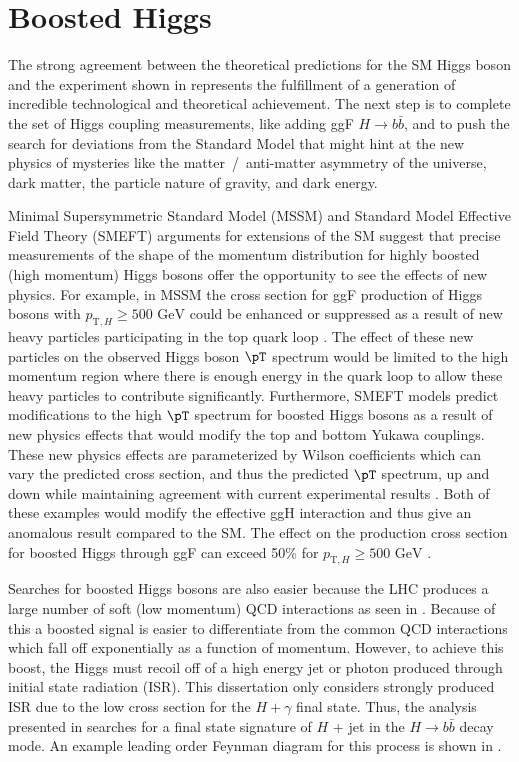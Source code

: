 \section{Boosted Higgs} \label{sec:higgs:boosted}

The strong agreement between the theoretical predictions for the SM Higgs boson
and the experiment shown in  represents the
fulfillment of a generation of incredible technological and theoretical
achievement.  The next step is to complete the set of Higgs coupling
measurements, like adding ggF $H \rightarrow b\bar{b}$, and to push the search
for deviations from the Standard Model that might hint at the new physics of
mysteries like the matter~/~anti-matter asymmetry of the universe, dark matter,
the particle nature of gravity, and dark energy. 

Minimal Supersymmetric Standard Model (MSSM) and Standard Model Effective Field
Theory (SMEFT) arguments for extensions of the SM suggest that precise
measurements of the shape of the momentum distribution for highly boosted (high
momentum) Higgs bosons offer the opportunity to see the effects of new physics.
For example, in MSSM the cross section for ggF production of Higgs bosons with
$p_{\text{T},H} \geq \text{500 GeV}$ could be enhanced or suppressed as a
result of new heavy particles participating in the top quark loop
\cite{Schlaffer:2014osa}. The effect of these new particles on the observed
Higgs boson $\pT$ spectrum would be limited to the high momentum region where
there is enough energy in the quark loop to allow these heavy particles to
contribute significantly. Furthermore,  SMEFT models predict modifications to
the high $\pT$ spectrum for boosted Higgs bosons as a result of new physics
effects that would modify the top and bottom Yukawa couplings.  These new
physics effects are parameterized by Wilson coefficients which can vary the
predicted cross section, and thus the predicted $\pT$ spectrum, up and down
while maintaining agreement with current experimental results
\cite{Grazzini:2016paz}. Both of these examples would modify the effective ggH
interaction and thus give an anomalous result compared to the SM. The effect on
the production cross section for boosted Higgs through ggF can exceed 50\% for
$p_{\text{T},H} \geq \text{500 GeV}$
\cite{Schlaffer:2014osa,Grojean:2013nya,Grazzini:2016paz,Dawson:2015gka}.

Searches for boosted Higgs bosons are also easier because the LHC produces a
large number of soft (low momentum) QCD interactions as seen in
.  Because of this a boosted signal is easier
to differentiate from the common QCD interactions which fall off exponentially
as a function of momentum.  However, to achieve this boost, the Higgs must
recoil off of a high energy jet or photon \cite{Aaboud:2018zba} produced
through initial state radiation (ISR). This dissertation only considers
strongly produced ISR due to the low cross section for the $H + \gamma$ final
state.  Thus, the analysis presented in  searches for a final
state signature of $H$ + jet in the $H \rightarrow b\bar{b}$ decay mode.  An
example leading order Feynman diagram for this process is shown in
.

